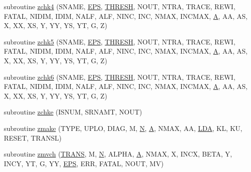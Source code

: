 \begin{DoxyCompactItemize}
\item 
subroutine \hyperlink{zblat2_8f_ad9d43cde9712596dfc11c7d026777795}{zchk4} (S\+N\+A\+M\+E, \hyperlink{tukey_8c_a6ebf6899d6c1c8b7b9d09be872c05aae}{E\+P\+S}, \hyperlink{zlaqgs_8c_a0656018abfc9fa2821827415f5d5ea57}{T\+H\+R\+E\+S\+H}, N\+O\+U\+T, N\+T\+R\+A, T\+R\+A\+C\+E, R\+E\+W\+I, F\+A\+T\+A\+L, N\+I\+D\+I\+M, I\+D\+I\+M, N\+A\+L\+F, A\+L\+F, N\+I\+N\+C, I\+N\+C, N\+M\+A\+X, I\+N\+C\+M\+A\+X, \hyperlink{classA}{A}, A\+A, A\+S, X, X\+X, X\+S, Y, Y\+Y, Y\+S, Y\+T, G, Z)
\item 
subroutine \hyperlink{zblat2_8f_acf42765025434e00f9e5bb5e0a7f510b}{zchk5} (S\+N\+A\+M\+E, \hyperlink{tukey_8c_a6ebf6899d6c1c8b7b9d09be872c05aae}{E\+P\+S}, \hyperlink{zlaqgs_8c_a0656018abfc9fa2821827415f5d5ea57}{T\+H\+R\+E\+S\+H}, N\+O\+U\+T, N\+T\+R\+A, T\+R\+A\+C\+E, R\+E\+W\+I, F\+A\+T\+A\+L, N\+I\+D\+I\+M, I\+D\+I\+M, N\+A\+L\+F, A\+L\+F, N\+I\+N\+C, I\+N\+C, N\+M\+A\+X, I\+N\+C\+M\+A\+X, \hyperlink{classA}{A}, A\+A, A\+S, X, X\+X, X\+S, Y, Y\+Y, Y\+S, Y\+T, G, Z)
\item 
subroutine \hyperlink{zblat2_8f_acc02c3810ce72520da59c0ea6a916104}{zchk6} (S\+N\+A\+M\+E, \hyperlink{tukey_8c_a6ebf6899d6c1c8b7b9d09be872c05aae}{E\+P\+S}, \hyperlink{zlaqgs_8c_a0656018abfc9fa2821827415f5d5ea57}{T\+H\+R\+E\+S\+H}, N\+O\+U\+T, N\+T\+R\+A, T\+R\+A\+C\+E, R\+E\+W\+I, F\+A\+T\+A\+L, N\+I\+D\+I\+M, I\+D\+I\+M, N\+A\+L\+F, A\+L\+F, N\+I\+N\+C, I\+N\+C, N\+M\+A\+X, I\+N\+C\+M\+A\+X, \hyperlink{classA}{A}, A\+A, A\+S, X, X\+X, X\+S, Y, Y\+Y, Y\+S, Y\+T, G, Z)
\item 
subroutine \hyperlink{zblat2_8f_aeded6062b08910a66e33a41338f27a62}{zchke} (I\+S\+N\+U\+M, S\+R\+N\+A\+M\+T, N\+O\+U\+T)
\item 
subroutine \hyperlink{zblat2_8f_adedd6c58099503010cc6951c138fa2b6}{zmake} (T\+Y\+P\+E, U\+P\+L\+O, D\+I\+A\+G, M, \hyperlink{polmisc_8c_a0240ac851181b84ac374872dc5434ee4}{N}, \hyperlink{classA}{A}, N\+M\+A\+X, A\+A, \hyperlink{example__user_8c_ae946da542ce0db94dced19b2ecefd1aa}{L\+D\+A}, K\+L, K\+U, R\+E\+S\+E\+T, T\+R\+A\+N\+S\+L)
\item 
subroutine \hyperlink{zblat2_8f_a5855f5864c71cc806045f56037f3ff30}{zmvch} (\hyperlink{superlu__enum__consts_8h_a0c4e17b2d5cea33f9991ccc6a6678d62a1f61e3015bfe0f0c2c3fda4c5a0cdf58}{T\+R\+A\+N\+S}, M, \hyperlink{polmisc_8c_a0240ac851181b84ac374872dc5434ee4}{N}, A\+L\+P\+H\+A, \hyperlink{classA}{A}, N\+M\+A\+X, X, I\+N\+C\+X, B\+E\+T\+A, Y, I\+N\+C\+Y, Y\+T, G, Y\+Y, \hyperlink{tukey_8c_a6ebf6899d6c1c8b7b9d09be872c05aae}{E\+P\+S}, E\+R\+R, F\+A\+T\+A\+L, N\+O\+U\+T, M\+V)

\end{DoxyCompactItemize}
